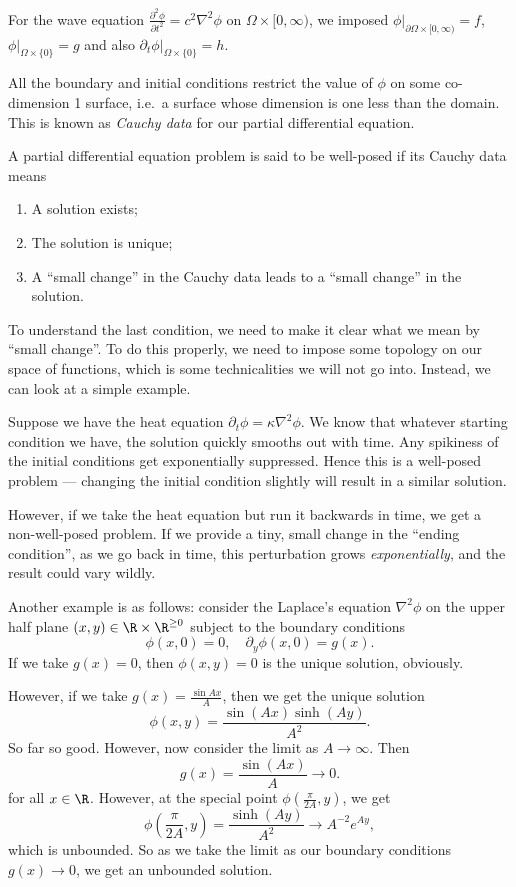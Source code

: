 \documentclass[a4paper]{article}
\begin{document}
For the wave equation $\frac{\partial^2 \phi}{\partial t^2} = c^2 \nabla^2 \phi$ on $\Omega \times [0, \infty)$, we imposed $\phi|_{\partial \Omega \times [0, \infty)} = f$, $\phi|_{\Omega \times \{0\}} = g$ and also $\partial_t \phi|_{\Omega \times \{0\}} = h$.

All the boundary and initial conditions restrict the value of $\phi$ on some co-dimension 1 surface, i.e.\ a surface whose dimension is one less than the domain. This is known as \emph{Cauchy data} for our partial differential equation.

\begin{defi}
  A partial differential equation problem is said to be well-posed if its Cauchy data means
  \begin{enumerate}
    \item A solution exists;
    \item The solution is unique;
    \item A ``small change'' in the Cauchy data leads to a ``small change'' in the solution.
  \end{enumerate}
\end{defi}
To understand the last condition, we need to make it clear what we mean by ``small change''. To do this properly, we need to impose some topology on our space of functions, which is some technicalities we will not go into. Instead, we can look at a simple example.

Suppose we have the heat equation $\partial_t \phi = \kappa \nabla^2 \phi$. We know that whatever starting condition we have, the solution quickly smooths out with time. Any spikiness of the initial conditions get exponentially suppressed. Hence this is a well-posed problem --- changing the initial condition slightly will result in a similar solution.

However, if we take the heat equation but run it backwards in time, we get a non-well-posed problem. If we provide a tiny, small change in the ``ending condition'', as we go back in time, this perturbation grows \emph{exponentially}, and the result could vary wildly.

Another example is as follows: consider the Laplace's equation $\nabla^2 \phi$ on the upper half plane $(x, y) \in \R \times \R^{\geq 0}$ subject to the boundary conditions
\[
  \phi(x, 0) = 0,\quad \partial_y \phi(x, 0) = g(x).
\]
If we take $g(x) = 0$, then $\phi(x, y) = 0$ is the unique solution, obviously.

However, if we take $g(x) = \frac{\sin Ax}{A}$, then we get the unique solution
\[
  \phi(x, y) = \frac{\sin (Ax) \sinh (Ay)}{A^2}.
\]
So far so good. However, now consider the limit as $A \to \infty$. Then
\[
  g(x) = \frac{\sin (Ax)}{A} \to 0.
\]
for all $x \in \R$. However, at the special point $\phi\left(\frac{\pi}{2A}, y\right)$, we get
\[
  \phi\left(\frac{\pi}{2A}, y\right) = \frac{\sinh (Ay)}{A^2} \to A^{-2} e^{Ay},
\]
which is unbounded. So as we take the limit as our boundary conditions $g(x) \to 0$, we get an unbounded solution.
\end{document}

